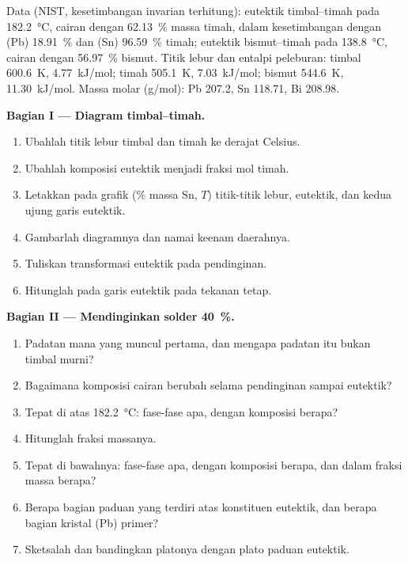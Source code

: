 \begin{problem}
\label{pb:b2:solid-liquid-diagrams:1}
Data (NIST, kesetimbangan invarian terhitung): eutektik timbal--timah pada
\qty{182.2}{\degreeCelsius}, cairan dengan 62.13~\% massa timah, dalam
kesetimbangan dengan (Pb) 18.91~\% dan (Sn) 96.59~\% timah; eutektik
bismut--timah pada \qty{138.8}{\degreeCelsius}, cairan dengan 56.97~\%
bismut. Titik lebur dan entalpi peleburan: timbal \qty{600.6}{K},
\qty{4.77}{kJ/mol}; timah \qty{505.1}{K}, \qty{7.03}{kJ/mol}; bismut
\qty{544.6}{K}, \qty{11.30}{kJ/mol}. Massa molar (\unit{g/mol}): Pb 207.2,
Sn 118.71, Bi 208.98.

\medskip
\noindent\textbf{Bagian I --- Diagram timbal--timah.}
\begin{enumerate}
  \item Ubahlah titik lebur timbal dan timah ke derajat Celsius.
  \item Ubahlah komposisi eutektik menjadi fraksi mol timah.
  \item Letakkan pada grafik (\% massa Sn, $T$) titik-titik lebur,
        eutektik, dan kedua ujung garis eutektik.
  \item Gambarlah diagramnya dan namai keenam daerahnya.
  \item Tuliskan transformasi eutektik pada pendinginan.
  \item Hitunglah  pada garis eutektik pada tekanan tetap.
\end{enumerate}

\medskip
\noindent\textbf{Bagian II --- Mendinginkan solder 40~\%.}
\begin{enumerate}[resume]
  \item Padatan mana yang muncul pertama, dan mengapa padatan itu bukan
        timbal murni?
  \item Bagaimana komposisi cairan berubah selama pendinginan sampai
        eutektik?
  \item Tepat di atas \qty{182.2}{\degreeCelsius}: fase-fase apa, dengan
        komposisi berapa?
  \item Hitunglah fraksi massanya.
  \item Tepat di bawahnya: fase-fase apa, dengan komposisi berapa, dan
        dalam fraksi massa berapa?
  \item Berapa bagian paduan yang terdiri atas konstituen eutektik, dan
        berapa bagian kristal (Pb) primer?
  \item Sketsalah  dan bandingkan platonya dengan plato
        paduan eutektik.
\end{enumerate}


\end{problem}
